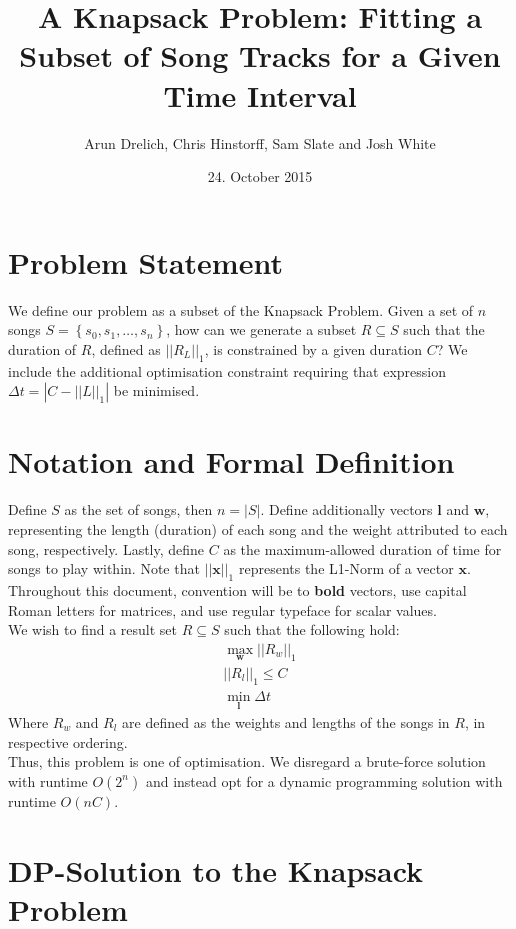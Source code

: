 \documentclass[11pt]{article}
\title{\textbf{A Knapsack Problem: Fitting a Subset of Song Tracks for a Given Time Interval}}
\author{Arun Drelich, Chris Hinstorff, Sam Slate and Josh White}
\date{24. October 2015}
\begin{document}
\maketitle

\section*{Problem Statement}

We define our problem as a subset of the Knapsack Problem. Given a set of $n$ songs $S = \left\{ {s_0, s_1, \ldots, s_n} \right\}$, how can we generate a subset $R \subseteq S$ such that the duration of $R$, defined as $||R_{L}||_{1}$, is constrained by a given duration $C$? We include the additional optimisation constraint requiring that expression $\Delta t = |C - {||L||}_{1}|$ be minimised.

\section*{Notation and Formal Definition}

Define $S$ as the set of songs, then $n = |S|$. Define additionally vectors $\mathbf{l}$ and $\mathbf{w}$, representing the length (duration) of each song and the weight attributed to each song, respectively. Lastly, define $C$ as the maximum-allowed duration of time for songs to play within. Note that $||\mathbf{x}||_{1}$ represents the L1-Norm of a vector $\mathbf{x}$. Throughout this document, convention will be to \textbf{bold} vectors, use capital Roman letters for matrices, and use regular typeface for scalar values. \\
We wish to find a result set $R \subseteq S$ such that the following hold:
\begin{gather}
  \max_{\mathbf{w}} {||R_{w}||_{1}} \\
  ||R_{l}||_{1} \leq C \\
  \min_{\mathbf{l}} {\Delta t}
\end{gather}
Where $R_{w}$ and $R_{l}$ are defined as the weights and lengths of the songs in $R$, in respective ordering. \\
Thus, this problem is one of optimisation. We disregard a brute-force solution with runtime $O(2^n)$ and instead opt for a dynamic programming solution with runtime $O(nC)$.

\section*{DP-Solution to the Knapsack Problem}
\end{document}

